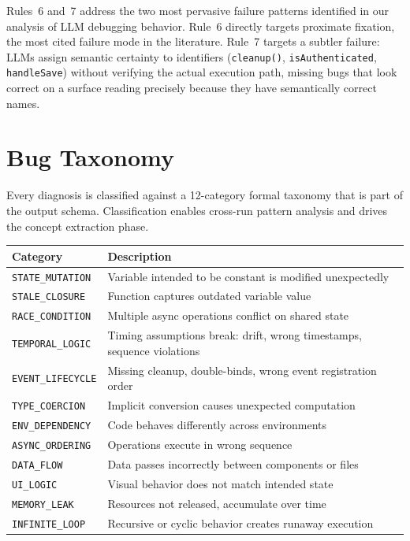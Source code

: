 \documentclass[12pt,a4paper]{article}
\newcommand{\code}[1]{\texttt{\small #1}}
\begin{document}
\vspace{6pt}
Rules~6 and~7 address the two most pervasive failure patterns identified in our analysis
of LLM debugging behavior. Rule~6 directly targets proximate fixation, the most cited
failure mode in the literature. Rule~7 targets a subtler failure: LLMs assign semantic
certainty to identifiers (\code{cleanup()}, \code{isAuthenticated}, \code{handleSave})
without verifying the actual execution path, missing bugs that look correct on a surface
reading precisely because they have semantically correct names.

\section{Bug Taxonomy}

Every diagnosis is classified against a 12-category formal taxonomy that is part of the
output schema. Classification enables cross-run pattern analysis and drives the concept
extraction phase.

\vspace{4pt}
\begin{center}
\begin{tabular}{@{}l p{9.8cm}@{}}
\toprule
\textbf{Category} & \textbf{Description} \\
\midrule
\code{STATE\_MUTATION}   & Variable intended to be constant is modified unexpectedly \\
\code{STALE\_CLOSURE}    & Function captures outdated variable value \\
\code{RACE\_CONDITION}   & Multiple async operations conflict on shared state \\
\code{TEMPORAL\_LOGIC}   & Timing assumptions break: drift, wrong timestamps, sequence violations \\
\code{EVENT\_LIFECYCLE}  & Missing cleanup, double-binds, wrong event registration order \\
\code{TYPE\_COERCION}    & Implicit conversion causes unexpected computation \\
\code{ENV\_DEPENDENCY}   & Code behaves differently across environments \\
\code{ASYNC\_ORDERING}   & Operations execute in wrong sequence \\
\code{DATA\_FLOW}        & Data passes incorrectly between components or files \\
\code{UI\_LOGIC}         & Visual behavior does not match intended state \\
\code{MEMORY\_LEAK}      & Resources not released, accumulate over time \\
\code{INFINITE\_LOOP}    & Recursive or cyclic behavior creates runaway execution \\
\bottomrule
\end{tabular}
\end{center}
\end{document}
